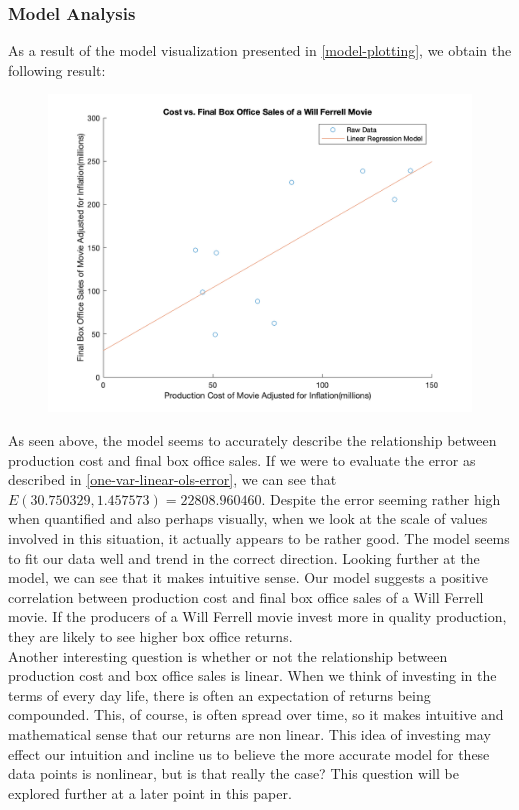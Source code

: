 \documentclass[11pt]{article}
\begin{document}
\subsubsection{Model Analysis}
\label{one-variable-linear-model-analysis}
As a result of the model visualization presented in \ref{model-plotting}, we obtain the following result:
\begin{figure}[H]
    \centering 
    \label{one-variable-linear-plot}
    \includegraphics[width=\textwidth]{models/a.png}
\end{figure}
As seen above, the model seems to accurately describe the relationship between production cost and final box office sales.  
If we were to evaluate the error as described in \ref{one-var-linear-ols-error}, we can see that $E(30.750329, 1.457573) = 22808.960460$. 
Despite the error seeming rather high when quantified and also perhaps visually, when we look at the scale of values involved in this situation, it actually appears to be rather good.  
The model seems to fit our data well and trend in the correct direction.  
Looking further at the model, we can see that it makes intuitive sense.  
Our model suggests a positive correlation between production cost and final box office sales of a Will Ferrell movie.  
If the producers of a Will Ferrell movie invest more in quality production, they are likely to see higher box office returns. 
\\

Another interesting question is whether or not the relationship between production cost and box office sales is linear.  
When we think of investing in the terms of every day life, there is often an expectation of returns being compounded.  
This, of course, is often spread over time, so it makes intuitive and mathematical sense that our returns are non linear. 
This idea of investing may effect our intuition and incline us to believe the more accurate model for these data points is nonlinear, but is that really the case?
This question will be explored further at a later point in this paper.
\end{document}
